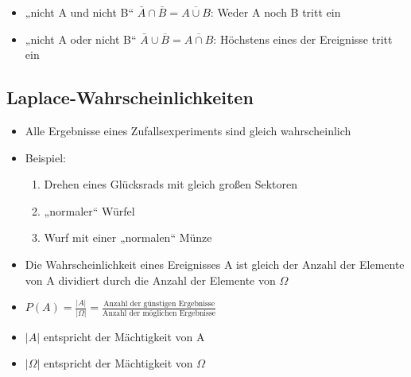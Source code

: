 \begin{itemize}
\item „nicht A und nicht B“ $\bar{A} \cap \bar{B} = \overline{A\cup B}$: Weder A noch B tritt ein\\ 
\item „nicht A oder nicht B“ $\bar{A} \cup \overline{B} = \overline{A \cap B}$: Höchstens eines der Ereignisse tritt ein \\ 
\end{itemize}
\subsection{Laplace-Wahrscheinlichkeiten}
\begin{itemize}
    \item Alle Ergebnisse eines Zufallsexperiments sind gleich wahrscheinlich
    \item Beispiel:
    \begin{enumerate}
        \item Drehen eines Glücksrads mit gleich großen Sektoren
        \item „normaler“ Würfel
        \item Wurf mit einer „normalen“ Münze
    \end{enumerate}
    \item Die Wahrscheinlichkeit eines Ereignisses A ist gleich der Anzahl der Elemente von A dividiert durch die Anzahl der Elemente von $\Omega$
    \item $P(A) = \frac{|A|}{|\Omega |} = \frac{\text{Anzahl der günstigen Ergebnisse}}{\text{Anzahl der möglichen Ergebnisse}}$
    \item $|A|$ entspricht der Mächtigkeit von A
    \item $|\Omega|$ entspricht der Mächtigkeit von $\Omega$
\end{itemize}
